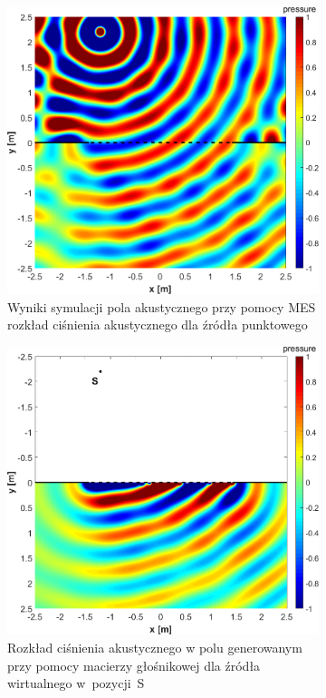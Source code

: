 \documentclass[12pt]{oska}
\begin{document}
\begin{figure}[!ht]
	\begin{subfigure}[b]{\textwidth}
  \centering
  \includegraphics[height=.41\textheight]{bitgraphics/real_500Hz.png}
  \caption{Wyniki symulacji pola akustycznego przy pomocy MES rozkład ciśnienia akustycznego dla źródła punktowego}
  \label{r:MES}
\end{subfigure}

\begin{subfigure}[b]{\textwidth}
	\centering
  \includegraphics[height=.41\textheight]{bitgraphics/virtual_500Hz.png}
  \caption{Rozkład ciśnienia akustycznego w polu generowanym przy pomocy macierzy głośnikowej dla źródła wirtualnego w~pozycji~S}
  \label{r:analitycznie}
\end{subfigure}
\caption{}
  \label{r:fem}

\end{figure}
\end{document}

